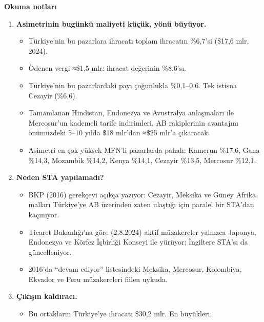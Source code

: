 \textbf{Okuma notları}

\begin{enumerate}
\def\labelenumi{\arabic{enumi}.}
\tightlist
\item
  \textbf{Asimetrinin bugünkü maliyeti küçük, yönü büyüyor.}

  \begin{itemize}
  \tightlist
  \item
    Türkiye'nin bu pazarlara ihracatı toplam ihracatın \%6,7'si (\$17,6 mlr, 2024).
  \item
    Ödenen vergi ≈\$1,5 mlr: ihracat değerinin \%8,6'sı.
  \item
    Türkiye'nin bu pazarlardaki payı çoğunlukla \%0,1--0,6. Tek istisna Cezayir (\%6,6).
  \item
    Tamamlanan Hindistan, Endonezya ve Avustralya anlaşmaları ile Mercosur'un kademeli tarife indirimleri, AB rakiplerinin avantajını önümüzdeki 5--10 yılda \$18 mlr'dan ≈\$25 mlr'a çıkaracak.
  \item
    Asimetri en çok yüksek MFN'li pazarlarda pahalı: Kamerun \%17,6, Gana \%14,3, Mozambik \%14,2, Kenya \%14,1, Cezayir \%13,5, Mercosur \%12,1.
  \end{itemize}
\item
  \textbf{Neden STA yapılamadı?}

  \begin{itemize}
  \tightlist
  \item
    BKP (2016) gerekçeyi açıkça yazıyor: Cezayir, Meksika ve Güney Afrika, malları Türkiye'ye AB üzerinden zaten ulaştığı için paralel bir STA'dan kaçınıyor. \etiketV{}
  \item
    Ticaret Bakanlığı'na göre (2.8.2024) aktif müzakereler yalnızca Japonya, Endonezya ve Körfez İşbirliği Konseyi ile yürüyor; İngiltere STA'sı da güncelleniyor. \etiketV{}
  \item
    2016'da ``devam ediyor'' listesindeki Meksika, Mercosur, Kolombiya, Ekvador ve Peru müzakereleri fiilen uykuda. \etiketD{}
  \end{itemize}
\item
  \textbf{Çıkışın kaldıracı.}

  \begin{itemize}
  \tightlist
  \item
    Bu ortakların Türkiye'ye ihracatı \$30,2 mlr. En büyükleri:


\end{itemize}
\end{enumerate}
